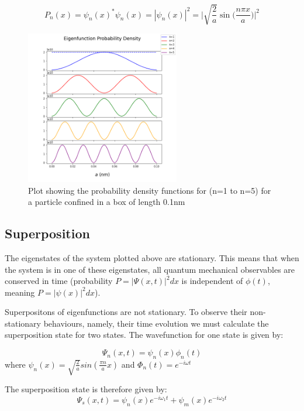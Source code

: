 $$P_n(x) =\psi_n (x)^{*}\psi_n (x) =|\psi_n(x)|^{2} = \Bigg|\sqrt{\frac{2}{a}}\sin\Big(\frac{n\pi x}{a}\Big)\Bigg|^{2}  $$

\begin{figure}[h]
    \centering
    \includegraphics[width=0.6\textwidth]{lab1/images/probabilityDensity.png} %
    \caption{Plot showing the probability density functions for (n=1 to n=5) for a particle confined in a box of length 0.1nm}
    \label{fig:probDens}
\end{figure}

\subsection{Superposition}

The eigenstates of the system plotted above are stationary. This means that when the system is in one of these eigenstates, all quantum mechanical observables are conserved in time (probability $P=|\Psi(x,t)|^2dx$ is independent of $\phi(t)$, meaning $P=|\psi(x)|^2dx$).

Superpositons of eigenfunctions are not stationary. To observe their non-stationary behaviours, namely, their time evolution we must calculate the superposition state for two states. The wavefunction for one state is given by:

$$\Psi_n (x,t) = \psi_n (x)\phi_n (t)$$
where $\psi_n (x)= \sqrt{\frac{2}{a}} sin(\frac{\pi n}{a}x)$ and $\Phi_n (t)= e^{-i \omega t}$

The superposition state is therefore given by:
\begin{equation} \label{eq:superPos}
\Psi_s (x,t) = \psi_n (x)e^{-i \omega_{1} t} + \psi_m (x)e^{-i \omega_{2} t}
\end{equation}


